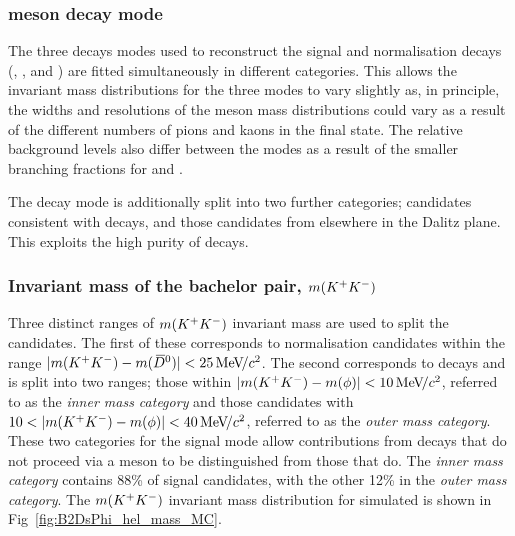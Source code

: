 \subsubsection{\Dsp meson decay mode} 
The three \Dsp decays modes used to reconstruct the signal and normalisation decays (\decay{\Dsp}{\Kp\Km\pip}, \decay{\Dsp}{\pip\pim\pip}, and \decay{\Dsp}{\Kp\pim\pip}) are fitted simultaneously in different categories. This allows the invariant mass distributions for the three modes to vary slightly
 as, in principle, the widths and resolutions of the \Bp meson mass distributions could vary as a result of the different numbers of pions and kaons in the final state. The relative background levels also differ between the modes as a result of the smaller branching fractions for \decay{\Dsp}{\pip\pim\pip} and \decay{\Dsp}{\Kp\pim\pip}. 

The \decay{\Dsp}{\Kp\Km\pip} decay mode is additionally split into two further categories; candidates consistent with \decay{\Dsp}{\phiz\pip} decays, and those candidates from elsewhere in the \decay{\Dsp}{\Kp\Km\pip} Dalitz plane. This exploits the high purity of \decay{\Dsp}{\phiz\pip} decays. 

\subsubsection{Invariant mass of the bachelor \Kp\Km pair, $m({{K}^+}{{K}^-})$} 
Three distinct ranges of $m({{K}^+}{{K}^-})$ invariant mass are used to split the candidates. The first of these corresponds to normalisation \decay{\Bp}{\Dsp\Dzb} candidates within the range $|m({{K}^+}{{K}^-})-m({{\kern 0.2em\overline{\kern -0.2em D}{}}{}^0})|<25 {\mathrm{\,Me\kern -0.1em V\!/}c^2}$. The second corresponds to \decay{\Bp}{\Dsp\phiz} decays and is split into two ranges; those within $|m({{K}^+}{{K}^-})-m(\phi)|<10{\mathrm{\,Me\kern -0.1em V\!/}c^2}$, referred to as the \emph{inner \phiz mass category} and those candidates with $10<|m(\Kp\Km)-m(\phiz)|<40\mevcc$, referred to as the \emph{outer \phiz mass category}. These two categories for the signal mode allow contributions from decays that do not proceed via a \phiz meson to be distinguished from those that do. The \emph{inner \phiz mass category} contains 88\% of signal \decay{\Bp}{\Dsp\phiz} candidates, with the other 12\% in the \emph{outer \phiz mass category}. The $m({{K}^+}{{K}^-})$ invariant mass distribution for simulated \decay{\Bp}{\Dsp\phiz} is shown in Fig~\ref{fig:B2DsPhi_hel_mass_MC}.



